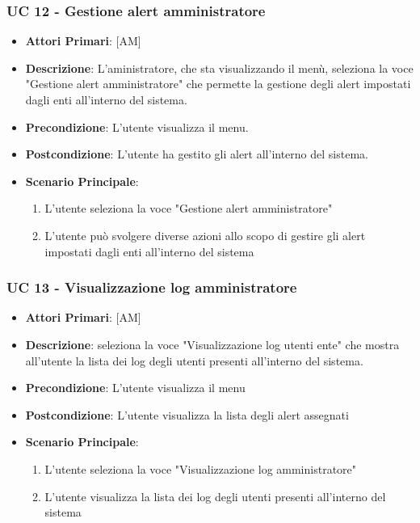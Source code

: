 		\subsubsection{UC 12 - Gestione alert amministratore}
		\begin{itemize}
			\item \textbf{Attori Primari}: [AM]
			\item \textbf{Descrizione}: L'aministratore, che sta visualizzando il menù, seleziona la voce "Gestione alert amministratore" che permette la gestione degli alert impostati dagli enti all'interno del sistema.
			\item \textbf{Precondizione}: L'utente visualizza il menu.
			\item \textbf{Postcondizione}: L'utente ha gestito gli alert all'interno del sistema.
			\item \textbf{Scenario Principale}:
			\begin{enumerate}
				\item{L'utente seleziona la voce "Gestione alert amministratore"}
				\item{L'utente può svolgere diverse azioni allo scopo di gestire gli alert impostati dagli enti all'interno del sistema}
			\end{enumerate}	
		\end{itemize}

		\subsubsection{UC 13 - Visualizzazione log amministratore}
		\begin{itemize}
			\item \textbf{Attori Primari}: [AM]
			\item \textbf{Descrizione}: seleziona la voce "Visualizzazione log utenti ente" che mostra all'utente la lista dei log degli utenti presenti all'interno del sistema.
			\item \textbf{Precondizione}: L'utente visualizza il menu
			\item \textbf{Postcondizione}: L'utente visualizza la lista degli alert assegnati
			\item \textbf{Scenario Principale}:
			\begin{enumerate}
				\item{L'utente seleziona la voce "Visualizzazione log amministratore"}
				\item{L'utente visualizza la lista dei log degli utenti presenti all'interno del sistema}
			\end{enumerate}	
		\end{itemize}
		